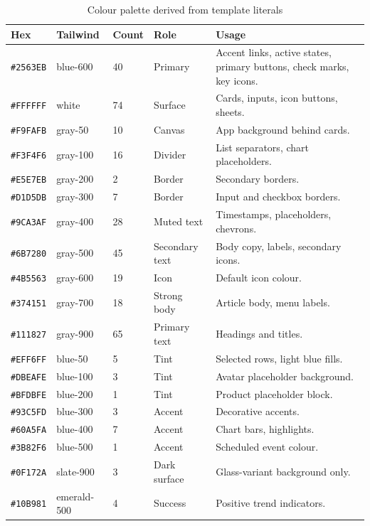 \begin{longtable}{p{2.3cm}p{2.2cm}p{1.7cm}p{1.2cm}p{5.8cm}}
\caption{Colour palette derived from template literals}\\
\toprule
\textbf{Hex} & \textbf{Tailwind} & \textbf{Count} & \textbf{Role} & \textbf{Usage} \\
\midrule

\texttt{\#2563EB} & blue-600 & 40 & Primary & Accent links, active states, primary
buttons, check marks, key icons. \\
\texttt{\#FFFFFF} & white & 74 & Surface & Cards, inputs, icon buttons, sheets. \\
\texttt{\#F9FAFB} & gray-50 & 10 & Canvas & App background behind cards. \\
\texttt{\#F3F4F6} & gray-100 & 16 & Divider & List separators, chart placeholders. \\
\texttt{\#E5E7EB} & gray-200 & 2 & Border & Secondary borders. \\
\texttt{\#D1D5DB} & gray-300 & 7 & Border & Input and checkbox borders. \\
\texttt{\#9CA3AF} & gray-400 & 28 & Muted text & Timestamps, placeholders, chevrons. \\
\texttt{\#6B7280} & gray-500 & 45 & Secondary text & Body copy, labels, secondary icons. \\
\texttt{\#4B5563} & gray-600 & 19 & Icon & Default icon colour. \\
\texttt{\#374151} & gray-700 & 18 & Strong body & Article body, menu labels. \\
\texttt{\#111827} & gray-900 & 65 & Primary text & Headings and titles. \\
\texttt{\#EFF6FF} & blue-50 & 5 & Tint & Selected rows, light blue fills. \\
\texttt{\#DBEAFE} & blue-100 & 3 & Tint & Avatar placeholder background. \\
\texttt{\#BFDBFE} & blue-200 & 1 & Tint & Product placeholder block. \\
\texttt{\#93C5FD} & blue-300 & 3 & Accent & Decorative accents. \\
\texttt{\#60A5FA} & blue-400 & 7 & Accent & Chart bars, highlights. \\
\texttt{\#3B82F6} & blue-500 & 1 & Accent & Scheduled event colour. \\
\texttt{\#0F172A} & slate-900 & 3 & Dark surface & Glass-variant background only. \\
\texttt{\#10B981} & emerald-500 & 4 & Success & Positive trend indicators. \\

\end{longtable}
